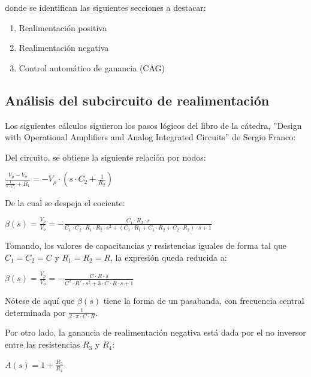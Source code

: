 \documentclass[../../tc_tp6_main.tex]{subfiles}
\begin{document}
donde se identifican las siguientes secciones a destacar: 

\begin{enumerate}
\item Realimentación positiva 
\item Realimentación negativa
\item Control automático de ganancia (CAG)
\end{enumerate}
\subsection{Análisis del subcircuito de realimentación}
\label{analsubreal}
	Los siguientes cálculos siguieron los pasos lógicos del libro de la cátedra, ''Design with Operational Amplifiers and Analog Integrated Circuits'' de Sergio Franco: \par
 Del circuito, se obtiene la siguiente relación por nodos: \par
 \begin{center}
 $\frac{V_\rho - V_o}{\frac{1}{s\cdot C_1}+R_1}= -V_\rho \cdot (s\cdot C_2 + \frac{1}{R_2})$
 	\end{center}
 	
 	De la cual se despeja el cociente: \par
 	
 	\begin{center} 
 	$\beta (s) = \frac{V_p}{V_o} = -\frac{C_1\cdot R_2 \cdot s}{C_1\cdot C_2\cdot R_1\cdot R_2 \cdot s^2 + (C_1\cdot R_1 + C_1\cdot R_2 +C_2\cdot R_2)\cdot s +1}$
 	\end{center}
 	Tomando, los valores de capacitancias y resistencias iguales de forma tal que $C_1 = C_2 = C$ y $R_1 = R_2 = R$, la expresión queda reducida a: \par
 	 \begin{center} 
 	$ \beta (s) = \frac{V_p}{V_o} = -\frac{C\cdot R \cdot s}{C^2\cdot R^2 \cdot s^2 +3\cdot C\cdot R\cdot s +1}$
 	\end{center}
 	\par Nótese de aquí que $\beta (s)$ tiene la forma de un pasabanda, con frecuencia central determinada por $\frac{1}{2\cdot \pi \cdot C\cdot R}$.\par
Por otro lado, la ganancia de realimentación negativa está dada por el no inversor entre las resistencias $R_3$ y  $R_4$:
	\begin{center} 
	$A(s) = 1+\frac{R_3}{R_4}$
	\end{center}
	 
\end{document}
